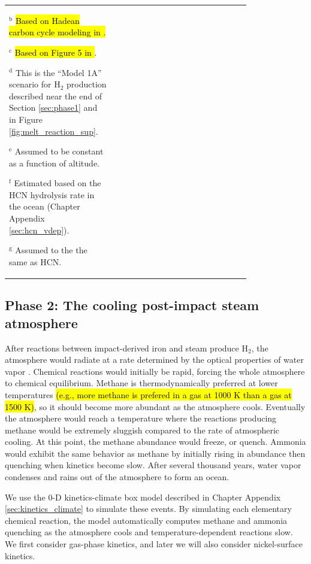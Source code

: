 \begin{table}
\begin{center}
\begin{tabularx}{0.9\linewidth}{p{0.3\linewidth} | p{0.2\linewidth} | p{0.3\linewidth}}
{    $^\text{b}$ \hl{Based on Hadean carbon cycle modeling in \mbox{\citet{Kadoya_2020}}.}

    $^\text{c}$ \hl{Based on Figure 5 in \mbox{\citet{Catling_2020}}}.

    $^\text{d}$ This is the ``Model 1A'' scenario for H$_2$ production described near the end of Section \ref{sec:phase1} and in Figure \ref{fig:melt_reaction_sup}.

    $^\text{e}$ Assumed to be constant as a function of altitude.

    $^\text{f}$ Estimated based on the HCN hydrolysis rate in the ocean (Chapter Appendix \ref{sec:hcn_vdep}).

    $^\text{g}$ Assumed to the the same as HCN.
  }
  \end{tabularx}
  \end{center}
\end{table}

\subsection{Phase 2: The cooling post-impact steam atmosphere} \label{sec:phase2}

After reactions between impact-derived iron and steam produce H$_2$, the atmosphere would radiate at a rate determined by the optical properties of water vapor \citep{Zahnle_2020}. Chemical reactions would initially be rapid, forcing the whole atmosphere to chemical equilibrium. Methane is thermodynamically preferred at lower temperatures \hl{(e.g., more methane is prefered in a gas at 1000 K than a gas at 1500 K)}, so it should become more abundant as the atmosphere cools. Eventually the atmosphere would reach a temperature where the reactions producing methane would be extremely sluggish compared to the rate of atmospheric cooling. At this point, the methane abundance would freeze, or quench. Ammonia would exhibit the same behavior as methane by initially rising in abundance then quenching when kinetics become slow. After several thousand years, water vapor condenses and rains out of the atmosphere to form an ocean.

We use the 0-D kinetics-climate box model described in Chapter Appendix \ref{sec:kinetics_climate} to simulate these events. By simulating each elementary chemical reaction, the model automatically computes methane and ammonia quenching as the atmosphere cools and temperature-dependent reactions slow. We first consider gas-phase kinetics, and later we will also consider nickel-surface kinetics.

